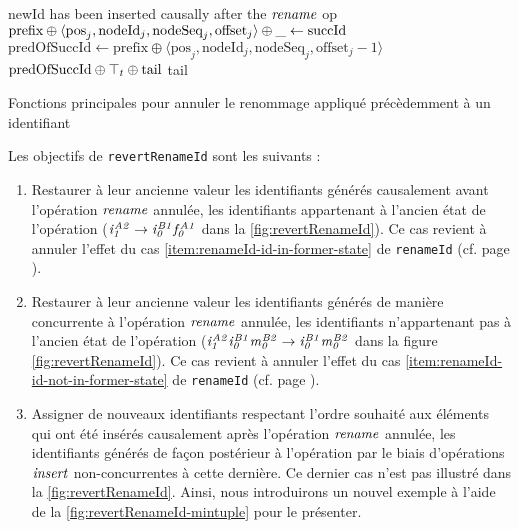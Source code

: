 \begin{algorithm}[!ht]
\begin{algorithmic}[1]
            \Statex \Comment newId has been inserted causally after the $\mathit{rename}$ op
            \State $\text{prefix} \oplus \langle \text{pos}_{j},\text{nodeId}_{j},\text{nodeSeq}_{j},\text{offset}_{j} \rangle \oplus \_ \leftarrow \text{succId}$
            \State $\text{predOfSuccId} \gets \text{prefix} \oplus \langle \text{pos}_j,\text{nodeId}_j,\text{nodeSeq}_j,\text{offset}_{j} - 1 \rangle$
            \State \Return $\text{predOfSuccId} \oplus \top_t \oplus \text{tail}$ \Comment \commenttopt
        \Else
            \State \Return tail \label{alg:revertRenameId-case-ii}
        \EndIf
    \EndFunction
  \end{algorithmic}
  \caption{Fonctions principales pour annuler le renommage appliqué précèdemment à un identifiant}
  \label{alg:revertRenameId}
\end{algorithm}

Les objectifs de \texttt{revertRenameId} sont les suivants :
\begin{enumerate}
  \item \label{item:revert-rename-1}
    Restaurer à leur ancienne valeur les identifiants générés causalement avant l'opération $\mathit{rename}$ annulée, \ie les identifiants appartenant à l'ancien état de l'opération (\eg $\mathit{i}^{\mathit{A2}}_{\mathit{1}} \rightarrow \mathit{i}^{\mathit{B1}}_{\mathit{0}}\mathit{f}^{\mathit{A1}}_{\mathit{0}}$ dans la \autoref{fig:revertRenameId}).
    Ce cas revient à annuler l'effet du cas \ref{item:renameId-id-in-former-state} de \texttt{renameId} (cf. page \pageref{item:renameId-id-in-former-state}).
  \item \label{item:revert-rename-2}
    Restaurer à leur ancienne valeur les identifiants générés de manière concurrente à l'opération $\mathit{rename}$ annulée, \ie les identifiants n'appartenant pas à l'ancien état de l'opération (\eg $\mathit{i}^{\mathit{A2}}_{\mathit{1}}\mathit{i}^{\mathit{B1}}_{\mathit{0}}\mathit{m}^{\mathit{B2}}_{\mathit{0}} \rightarrow \mathit{i}^{\mathit{B1}}_{\mathit{0}}\mathit{m}^{\mathit{B2}}_{\mathit{0}}$ dans la figure \autoref{fig:revertRenameId}).
    Ce cas revient à annuler l'effet du cas \ref{item:renameId-id-not-in-former-state} de \texttt{renameId} (cf. page \pageref{item:renameId-id-in-former-state}).
  \item \label{item:revert-rename-3}
    Assigner de nouveaux identifiants respectant l'ordre souhaité aux éléments qui ont été insérés causalement après l'opération $\mathit{rename}$ annulée, \ie les identifiants générés de façon postérieur à l'opération par le biais d'opérations $\mathit{insert}$ non-concurrentes à cette dernière.
    Ce dernier cas n'est pas illustré dans la \autoref{fig:revertRenameId}.
    Ainsi, nous introduirons un nouvel exemple à l'aide de la \autoref{fig:revertRenameId-mintuple} pour le présenter.
\end{enumerate}

